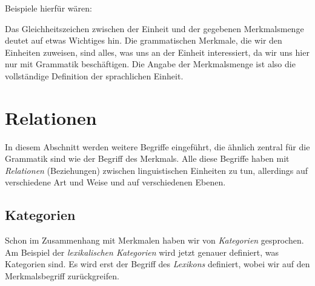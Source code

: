 \begin{exe}
\end{exe}

Beispiele hierfür wären:

\begin{exe}
  \ex
  \begin{xlist}
  \end{xlist}
\end{exe}

Das Gleichheitszeichen zwischen der Einheit und der gegebenen Merkmalsmenge deutet auf etwas Wichtiges hin.
Die grammatischen Merkmale, die wir den Einheiten zuweisen, sind alles, was uns an der Einheit interessiert, da wir uns hier nur mit Grammatik beschäftigen.
Die Angabe der Merkmalsmenge ist also die vollständige Definition der sprachlichen Einheit.

\section{Relationen}

\label{sec:relationen}

In diesem Abschnitt werden weitere Begriffe eingeführt, die ähnlich zentral für die Grammatik sind wie der Begriff des Merkmals.
Alle diese Begriffe haben mit \textit{Relationen} (Beziehungen) zwischen linguistischen Einheiten zu tun, allerdings auf verschiedene Art und Weise und auf verschiedenen Ebenen.

\subsection{Kategorien}

\label{sec:kategorien}


Schon im Zusammenhang mit Merkmalen haben wir von \textit{Kategorien} gesprochen.
Am Beispiel der \textit{lexikalischen Kategorien} wird jetzt genauer definiert, was Kategorien sind.
Es wird erst der Begriff des \textit{Lexikons} definiert, wobei wir auf den Merkmalsbegriff zurückgreifen.

